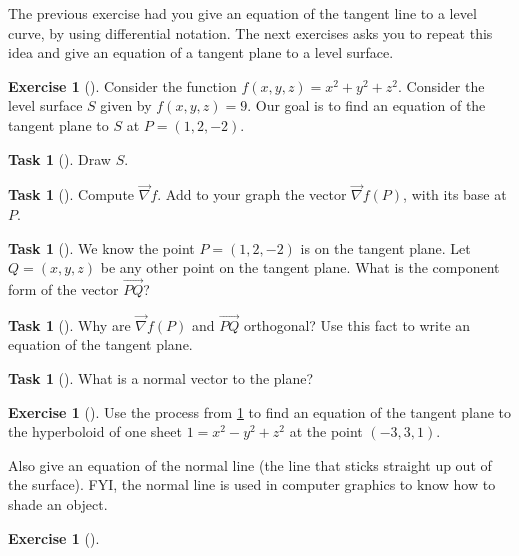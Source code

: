 \documentclass[10pt,]{book}
\theoremstyle{plain}
\theoremstyle{definition}
\theoremstyle{definition}
\theoremstyle{definition}
\theoremstyle{definition}
\newtheorem{exploration}[project]{Exercise}
\newtheorem{task}[project]{Task}
\theoremstyle{definition}
\numberwithin{equation}{section}
\begin{document}
The previous exercise had you give an equation of the tangent line to a level curve, by using differential notation. The next exercises asks you to repeat this idea and give an equation of a tangent plane to a level surface.%
\begin{exploration}[]\label{prob_gradient_to_tangent_practice}
Consider the function \(f(x,y,z)=x^2+y^2+z^2\). Consider the level surface \(S\) given by \(f(x,y,z)=9\). Our goal is to find an equation of the tangent plane to \(S\) at \(P=(1,2,-2)\).%
\begin{task}[]\label{task-625}
Draw \(S\).%
\end{task}
\begin{task}[]\label{task-626}
Compute \(\vec \nabla f\). Add to your graph the vector \(\vec \nabla f(P)\), with its base at \(P\).%
\end{task}
\begin{task}[]\label{task-627}
We know the point \(P=(1,2,-2)\) is on the tangent plane. Let \(Q=(x,y,z)\) be any other point on the tangent plane.  What is the component form of the vector \(\vec {PQ}\)?%
\end{task}
\begin{task}[]\label{task-628}
Why are  \(\vec \nabla f(P)\) and \(\vec{PQ}\) orthogonal? Use this fact to write an equation of the tangent plane.%
\end{task}
\begin{task}[]\label{task-629}
What is a normal vector to the plane?%
\end{task}
\end{exploration}
\begin{exploration}[]\label{exploration-234}
Use the process from \hyperref[prob_gradient_to_tangent_practice]{\ref{prob_gradient_to_tangent_practice}} to find an equation of the tangent plane to the hyperboloid of one sheet \(1=x^2-y^2+z^2\) at the point \((-3,3,1)\).%
\par
Also give an equation of the normal line (the line that sticks straight up out of the surface). FYI, the normal line is used in computer graphics to know how to shade an object.%
\end{exploration}
\begin{exploration}[]\label{exploration-235}
\end{exploration}
\typeout{************************************************}
\typeout{************************************************}
\end{document}
